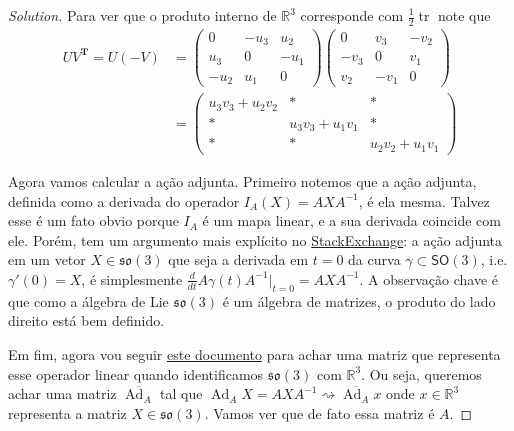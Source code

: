 \begin{proof}[Solution]
Para ver que o produto interno de $\mathbb{R}^{3}$ corresponde com $\frac{1}{2}\operatorname{tr}$ note que
\begin{align*}
	UV^{\mathbf{T}}=U(-V)&=\begin{pmatrix} 0&-u_3&u_2\\u_3&0&-u_1\\-u_2&u_1&0 \end{pmatrix} \begin{pmatrix} 0&v_3&-v_2\\-v_3&0&v_1\\v_2&-v_1&0 \end{pmatrix} \\
		       &=\begin{pmatrix} u_3v_3+u_2v_2&*&*\\ *&u_3v_3+u_1v_1&*\\ *&*&u_2v_2+u_1v_1 \end{pmatrix} 
\end{align*}

\item Agora vamos calcular a ação adjunta. 
Primeiro notemos que a ação adjunta, definida como a derivada do operador $I_A(X)=AXA^{-1}$, é ela mesma. Talvez esse é um fato obvio porque $I_A$  é um mapa linear, e a sua derivada coincide com ele. Porém, tem um argumento mais explícito no \href{https://math.stackexchange.com/questions/512026/prove-that-the-action-of-a-lie-group-on-its-lie-algebra-via-the-adjoint-represen}{StackExchange}: a ação adjunta em um vetor  $X\in\mathfrak{so}(3)$ que seja a derivada em $t=0$ da curva $\gamma\subset \mathsf{SO}(3)$, i.e.  $\gamma'(0)=X$, é simplesmente $\frac{d}{dt}A\gamma(t)A^{-1}\Big|_{t=0}=AXA^{-1}$. A observação chave é que como a álgebra de Lie $\mathfrak{so}(3)$ é um álgebra de matrizes, o produto do lado direito está bem definido.

Em fim, agora vou seguir \href{https://www.ethaneade.org/lie.pdf}{este documento} para achar uma matriz que representa esse operador linear quando identificamos $\mathfrak{so}(3)$ com $\mathbb{R}^{3}$. Ou seja, queremos achar uma matriz  $\overline{\operatorname{Ad}_A}$ tal que $\operatorname{Ad}_AX=AXA^{-1}\rightsquigarrow \overline{\operatorname{Ad}_A}x$ onde $x\in\mathbb{R}^{3}$  representa a matriz $X\in\mathfrak{so}(3)$. Vamos ver que de fato essa matriz é $A$.


\end{proof}
